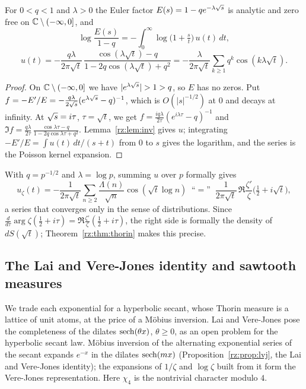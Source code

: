 \begin{proposition}\label{rz:prop:euler}
For $0<q<1$ and $\lambda>0$ the Euler factor $E(s)=1-qe^{-\lambda\sqrt{s}}$ is analytic and zero free on $\mathbb{C}\setminus(-\infty,0]$, and
\[
\log\frac{E(s)}{1-q}=-\int_0^\infty\log\bigl(1+\tfrac st\bigr)\,u(t)\,dt,
\]
\[
u(t)=-\frac{q\lambda}{2\pi\sqrt t}\,\frac{\cos(\lambda\sqrt t)-q}{1-2q\cos(\lambda\sqrt t)+q^2}
=-\frac{\lambda}{2\pi\sqrt t}\sum_{k\ge1}q^k\cos(k\lambda\sqrt t).
\]
\end{proposition}

\begin{proof}
On $\mathbb{C}\setminus(-\infty,0]$ we have $|e^{\lambda\sqs}|>1>q$, so $E$ has no zeros. Put $f=-E'/E=-\frac{q\lambda}{2\sqrt{s}}(e^{\lambda\sqrt{s}}-q)^{-1}$, which is $O(|s|^{-1/2})$ at $0$ and decays at infinity. At $\sqrt{s}=i\tau$, $\tau=\sqrt t$, we get $f=\frac{iq\lambda}{2\tau}(e^{i\lambda\tau}-q)^{-1}$ and $\Im f=\frac{q\lambda}{2\tau}\,\frac{\cos\lambda\tau-q}{1-2q\cos\lambda\tau+q^2}$. Lemma~\ref{rz:lem:inv} gives $u$; integrating $-E'/E=\int u(t)\,dt/(s+t)$ from $0$ to $s$ gives the logarithm, and the series is the Poisson kernel expansion.
\end{proof}

With $q=p^{-1/2}$ and $\lambda=\log p$, summing $u$ over $p$ formally gives
\begin{equation}\label{rz:eq:formal}
u_\zeta(t)=-\frac{1}{2\pi\sqrt t}\sum_{n\ge2}\frac{\Lambda(n)}{\sqrt n}\cos(\sqrt t\log n)
\;\;\text{``}=\text{''}\;\;\frac{1}{2\pi\sqrt t}\,\Re\frac{\zeta'}{\zeta}\bigl(\tfrac12+i\sqrt t\bigr),
\end{equation}
a series that converges only in the sense of distributions. Since $\frac{d}{d\tau}\arg\zeta(\frac12+i\tau)=\Re\frac{\zeta'}{\zeta}(\frac12+i\tau)$, the right side is formally the density of $dS(\sqrt t)$; Theorem~\ref{rz:thm:thorin} makes this precise.

\subsection{The Lai and Vere-Jones identity and sawtooth measures}\label{rz:sec:lvj}

We trade each exponential for a hyperbolic secant, whose Thorin measure is a lattice of unit atoms, at the price of a M\"obius inversion. Lai and Vere-Jones \cite{LVJ} pose the completeness of the dilates $\operatorname{sech}(\theta x)$, $\theta\ge0$, as an open problem for the hyperbolic secant law. M\"obius inversion of the alternating exponential series of the secant expands $e^{-x}$ in the dilates $\operatorname{sech}(mx)$ (Proposition~\ref{rz:prop:lvj}, the Lai and Vere-Jones identity); the expansions of $1/\zeta$ and $\log\zeta$ built from it form the Vere-Jones representation. Here $\chi_4$ is the nontrivial character modulo $4$.

